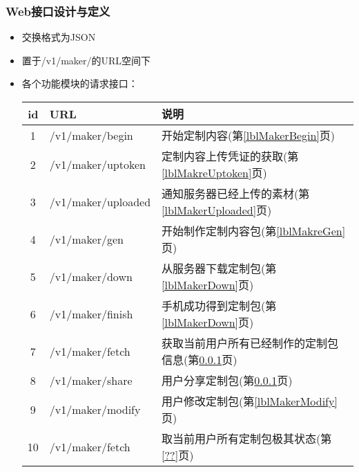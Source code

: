 \documentclass{beamer}
\begin{document}
\begin{frame}
\frametitle{Web接口设计与定义}

\begin{itemize}
 \item 交换格式为JSON
 \item 置于/v1/maker/的URL空间下
 \item 各个功能模块的请求接口：
 
 \vspace{0.2cm}
 \bgroup
\def\arraystretch{1.15} 
\scriptsize
\begin{tabular}{|c|l|l|}
\hline
{id} &{URL} & {说明}\\
\hline
{1} &{/v1/maker/begin} & {开始定制内容(第\ref{lblMakerBegin}页)}  \\
{2} &{/v1/maker/uptoken} & {定制内容上传凭证的获取(第\ref{lblMakreUptoken}页)}  \\
{3} & {/v1/maker/uploaded} & {通知服务器已经上传的素材(第\ref{lblMakerUploaded}页)} \\
{4} & {/v1/maker/gen} & {开始制作定制内容包(第\ref{lblMakreGen}页)}  \\
{5} & {/v1/maker/down} & {从服务器下载定制包(第\ref{lblMakerDown}页)} \\
{6} & {/v1/maker/finish} & {手机成功得到定制包(第\ref{lblMakerDown}页)} \\
{7} & {/v1/maker/fetch} & {获取当前用户所有已经制作的定制包信息(第\ref{}页)} \\
{8} & {/v1/maker/share} & {用户分享定制包(第\ref{}页)} \\
{9} & {/v1/maker/modify} & {用户修改定制包(第\ref{lblMakerModify}页)} \\
{10} & {/v1/maker/fetch} & {取当前用户所有定制包极其状态(第\ref{??}页)} \\
\hline
\end{tabular}
\egroup

\end{itemize}

\end{frame}
\end{document}

